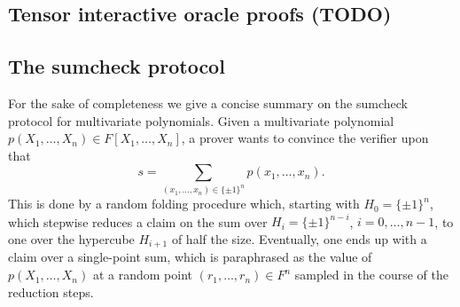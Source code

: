 \documentclass[11pt]{article}
\theoremstyle{definition}
\theoremstyle{remark}
\begin{document}
\subsection{Tensor interactive oracle proofs (TODO)}

\subsection{The sumcheck protocol}

For the sake of completeness we give a concise summary on the sumcheck protocol \cite{sumcheck} for multivariate polynomials.
Given a multivariate polynomial $p(X_1,\ldots, X_n)\in F[X_1,\ldots, X_n]$, a prover wants to convince the verifier upon that
\begin{equation*}
s = \sum_{(x_1,\ldots, x_n) \in \{\pm 1\}^n} p(x_1, \ldots, x_n).
\end{equation*}
This is done by a random folding procedure which, starting with $H_0=\{\pm 1\}^n$, which stepwise reduces a claim on the sum over $H_i = \{\pm 1\}^{n-i}$, $i=0,\ldots, n-1$, to one over the hypercube $H_{i+1}$ of half the size. 
Eventually, one ends up with a claim over a single-point sum, which is paraphrased as the value of $p(X_1,\ldots, X_n)$ at a random point $(r_1,\ldots, r_n)\in F^n$ sampled in the course of the reduction steps.

 
\end{document}
